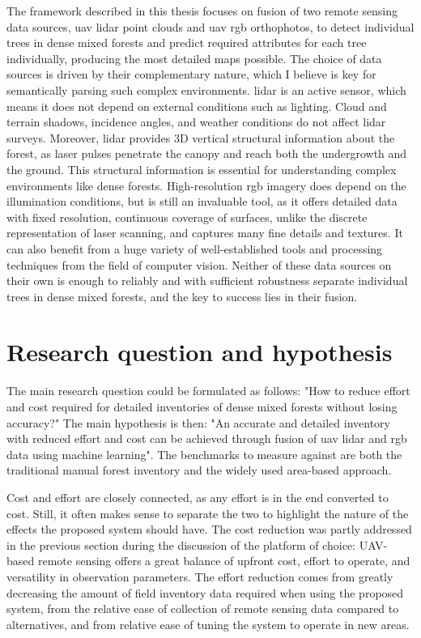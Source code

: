 The framework described in this thesis focuses on fusion of two remote sensing data sources, \gls{uav} \gls{lidar} point clouds and \gls{uav} \gls{rgb} orthophotos, to detect individual trees in dense mixed forests and predict required attributes for each tree individually, producing the most detailed maps possible.
The choice of data sources is driven by their complementary nature, which I believe is key for semantically parsing such complex environments.
\gls{lidar} is an active sensor, which means it does not depend on external conditions such as lighting.
Cloud and terrain shadows, incidence angles, and weather conditions do not affect \gls{lidar} surveys.
Moreover, \gls{lidar} provides 3D vertical structural information about the forest, as laser pulses penetrate the canopy and reach both the undergrowth and the ground.
This structural information is essential for understanding complex environments like dense forests.
High-resolution \gls{rgb} imagery does depend on the illumination conditions, but is still an invaluable tool, as it offers detailed data with fixed resolution, continuous coverage of surfaces, unlike the discrete representation of laser scanning, and captures many fine details and textures.
It can also benefit from a huge variety of well-established tools and processing techniques from the field of computer vision.
Neither of these data sources on their own is enough to reliably and with sufficient robustness separate individual trees in dense mixed forests, and the key to success lies in their fusion.

\section{Research question and hypothesis}\label{sec-research-question}

The main research question could be formulated as follows: "How to reduce effort and cost required for detailed inventories of dense mixed forests without losing accuracy?"
The main hypothesis is then: "An accurate and detailed inventory with reduced effort and cost can be achieved through fusion of \gls{uav} \gls{lidar} and \gls{rgb} data using machine learning".
The benchmarks to measure against are both the traditional manual forest inventory and the widely used area-based approach.

Cost and effort are closely connected, as any effort is in the end converted to cost.
Still, it often makes sense to separate the two to highlight the nature of the effects the proposed system should have.
The cost reduction was partly addressed in the previous section during the discussion of the platform of choice: UAV-based remote sensing offers a great balance of upfront cost, effort to operate, and versatility in observation parameters.
The effort reduction comes from greatly decreasing the amount of field inventory data required when using the proposed system, from the relative ease of collection of remote sensing data compared to alternatives, and from relative ease of tuning the system to operate in new areas.


